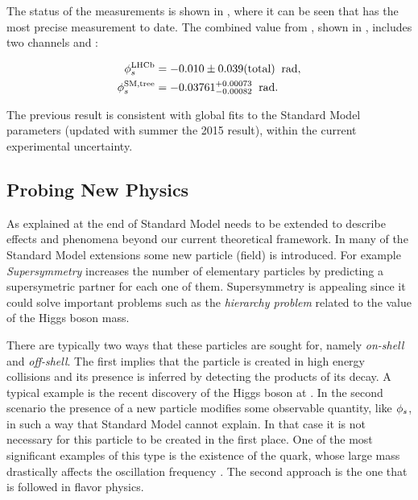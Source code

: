 The status of the \phis measurements is shown in , where it can be seen that \lhcb has
the most precise measurement to date. The combined \phis value from \lhcb \cite{phis-3fb-paper}, shown in
, includes two channels \BsJpsiPhi and \BsJpsipipi:

\begin{subequations}
  \label{phis_lhcb_theo}
  \begin{align}
  \centering
  \phiS{\lhcb}           &=  -0.010 \pm 0.039(\text{total})  \;\; \text{rad},
  \label{phis_lhcb}\\
  \phiS{SM,tree}  &= -0.03761 {}^{+0.00073}_{-0.00082}  \;\; \text{rad}.
  \label{phis_theo}
\end{align}
\end{subequations}

\noindent The previous result is consistent with global fits to the Standard Model parameters
 \cite{ckm-fitter-phis-pred} (updated with summer the 2015 result), within the current experimental uncertainty.

\subsection{Probing New Physics}
\label{probe_new_phys}

As explained at the end of  Standard Model needs to be extended
to describe effects and phenomena beyond our current theoretical framework. In many of the Standard Model
extensions some new particle (field) is introduced. For example {\it Supersymmetry} \cite{Golfand:1971iw,Volkov:1973ix,Wess:1974tw}
increases the number of elementary particles by predicting a supersymetric partner for each one of them.
Supersymmetry is appealing since it could solve important problems such as the {\it hierarchy problem}
related to the value of the Higgs boson mass.

There are typically two ways that these particles are sought for, namely {\it on-shell} and {\it off-shell}.
The first implies that the particle is created in high energy collisions and its presence is inferred by detecting the products of
its decay. A typical example is the recent discovery of the Higgs boson at \lhc \cite{higgs-cms,higgs-atlas}.
In the second scenario the presence of a new particle modifies some observable quantity, like $\phi_{s}$, in such a way that Standard Model
cannot explain. In that case it is not necessary for this particle to be created in the first place.
One of the most significant examples of this type is the existence of the \tquark quark, whose large mass
drastically affects the \BdBdbarSyst oscillation frequency \cite{argus-bbmix}. The second approach is the one
that is followed in flavor physics.

